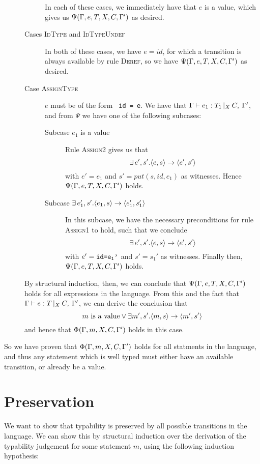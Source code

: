 \documentclass[a4paper]{article}
\begin{document}
\begin{description}
\begin{description}
					In each of these cases, we immediately have that $e$ is a value,
					which gives us $\Psi(\Gamma, e, T, X, C, \Gamma')$ as desired.

				\item[Cases \textsc{IdType} and \textsc{IdTypeUndef}] \hfill

					In both of these cases, we have $e=id$, for which a
					transition is always available by rule \textsc{Deref}, so
					we have $\Psi(\Gamma, e, T, X, C, \Gamma')$ as desired.
				
				\item[Case \textsc{AssignType}] \hfill

					$e$ must be of the form \texttt{\var\ id = e}. We
					have that $\Gamma{}\vdash e_1: T_1\,|_X\:C,\:\Gamma'$, and from $\Psi$ we have one
					of the following subcases:

					\begin{description}
						\item[Subcase $e_1$ is a value] \hfill

							Rule \textsc{Assign2} gives us that 
							$$\exists{}\, e', s'. \langle{}e,s\rangle{}\rightarrow{}\langle{}e',s'\rangle$$
							with $e'=e_1$ and $s'=put(s,id,e_1)$ as witnesses. 
							Hence $\Psi(\Gamma, e, T, X, C, \Gamma')$ holds.

						\item[Subcase $\exists{}\, e_1', s'. \langle{}e_1,s\rangle{}\rightarrow{}\langle{}e_1',s_1'\rangle$]

							In this subcase, we have the necessary
							preconditions for rule \textsc{Assign1} to hold,
							such that we conclude $$\exists{}\, e', s'.
							\langle{}e,s\rangle{}\rightarrow{}\langle{}e',s'\rangle$$ with
							$e'=\texttt{id=e\textsubscript{1}'}$ and $s'=s_1'$ as
							witnesses. Finally then, $\Psi(\Gamma, e, T, X, C, \Gamma')$ holds.

					\end{description}

			\end{description}

			By structural induction, then, we can conclude that $\Psi(\Gamma, e, T, X, C, \Gamma')$
			holds for all expressions in the language. From this and the fact
			that $\Gamma{}\vdash e: T\,|_X\:C,\:\Gamma'$, we can derive the conclusion that 
			$$\textrm{$m$ is a value} \vee
				\exists m', s'. \langle{}m,s\rangle{}\rightarrow{}\langle{}m',s'\rangle$$
			and hence that $\Phi(\Gamma, m, X, C, \Gamma')$ holds in this case.
	\end{description}
	
	So we have proven that $\Phi(\Gamma, m, X, C, \Gamma')$ holds for all statments in the language,
	and thus any statement which is well typed must either have an available
	transition, or already be a value.


\section*{Preservation}
	
	We want to show that typability is preserved by all possible transitions
	in the language. We can show this by structural induction over the
	derivation of the typability judgement for some statement $m$, using the
	following induction hypothesis:

	
\end{document}
